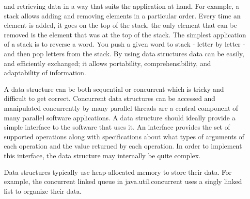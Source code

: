 and retrieving data in a way that suits the application at hand. For example, a stack allows adding and removing elements in a particular order. Every time an element is added, it goes on the top of the stack, the only element that can be removed is the element that was at the top of the stack. The simplest application of a stack is to reverse a word. You push a given word to stack - letter by letter - and then pop letters from the stack.
By using data structures data can be easily, and efficiently exchanged; it allows portability, comprehensibility, and adaptability of information.

A data structure can be both sequential or concurrent which is tricky and difficult to get correct. Concurrent data structures can be accessed and manipulated concurrently by many parallel threads are a central component of many parallel software applications. A data structure should ideally provide a simple interface to the software that uses it. An interface provides the set of supported operations along with specifications about what types of arguments of each operation and the value returned by each operation. In order to implement this interface, the data structure may internally be quite complex.

Data structures typically use heap-allocated memory to store their data. For example, the concurrent linked queue in java.util.concurrent uses a singly linked list to organize their data. %



